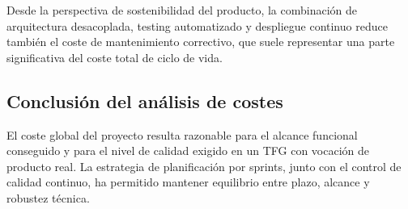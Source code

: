 Desde la perspectiva de sostenibilidad del producto,
la combinaci\'on de arquitectura desacoplada,
testing automatizado y despliegue continuo
reduce tambi\'en el coste de mantenimiento correctivo,
que suele representar una parte significativa del coste total de ciclo de vida.

\subsection{Conclusi\'on del an\'alisis de costes}

El coste global del proyecto resulta razonable para el alcance funcional conseguido
y para el nivel de calidad exigido en un TFG con vocaci\'on de producto real.
La estrategia de planificaci\'on por sprints, junto con el control de calidad continuo,
ha permitido mantener equilibrio entre plazo, alcance y robustez t\'ecnica.

	
